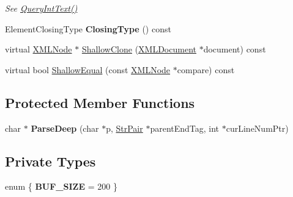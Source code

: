 \begin{DoxyCompactItemize}
\begin{DoxyCompactList}\small\item\em See \hyperlink{classtinyxml2_1_1XMLElement_a71327c9a9d8840562bd204f46d0a7189}{Query\+Int\+Text()} \end{DoxyCompactList}\item 
Element\+Closing\+Type {\bfseries Closing\+Type} () const \hypertarget{classtinyxml2_1_1XMLElement_ae8aec1d851cf5a09a91c919ab3b19125}{}\label{classtinyxml2_1_1XMLElement_ae8aec1d851cf5a09a91c919ab3b19125}

\item 
virtual \hyperlink{classtinyxml2_1_1XMLNode}{X\+M\+L\+Node} $\ast$ \hyperlink{classtinyxml2_1_1XMLElement_a85d85e32c18863fff1eeed53ae1ce23d}{Shallow\+Clone} (\hyperlink{classtinyxml2_1_1XMLDocument}{X\+M\+L\+Document} $\ast$document) const 
\item 
virtual bool \hyperlink{classtinyxml2_1_1XMLElement_a25d51a2aad92625c78441457d58c85bc}{Shallow\+Equal} (const \hyperlink{classtinyxml2_1_1XMLNode}{X\+M\+L\+Node} $\ast$compare) const 
\end{DoxyCompactItemize}
\subsection*{Protected Member Functions}
\begin{DoxyCompactItemize}
\item 
char $\ast$ {\bfseries Parse\+Deep} (char $\ast$p, \hyperlink{classtinyxml2_1_1StrPair}{Str\+Pair} $\ast$parent\+End\+Tag, int $\ast$cur\+Line\+Num\+Ptr)\hypertarget{classtinyxml2_1_1XMLElement_a072998100b7d0ba5e8aeac6dd6dfb31b}{}\label{classtinyxml2_1_1XMLElement_a072998100b7d0ba5e8aeac6dd6dfb31b}

\end{DoxyCompactItemize}
\subsection*{Private Types}
\begin{DoxyCompactItemize}
\item 
enum \{ {\bfseries B\+U\+F\+\_\+\+S\+I\+ZE} = 200
 \}\hypertarget{classtinyxml2_1_1XMLElement_a07a6ce25c17aaa505933db57f2373e50}{}\label{classtinyxml2_1_1XMLElement_a07a6ce25c17aaa505933db57f2373e50}

\end{DoxyCompactItemize}
